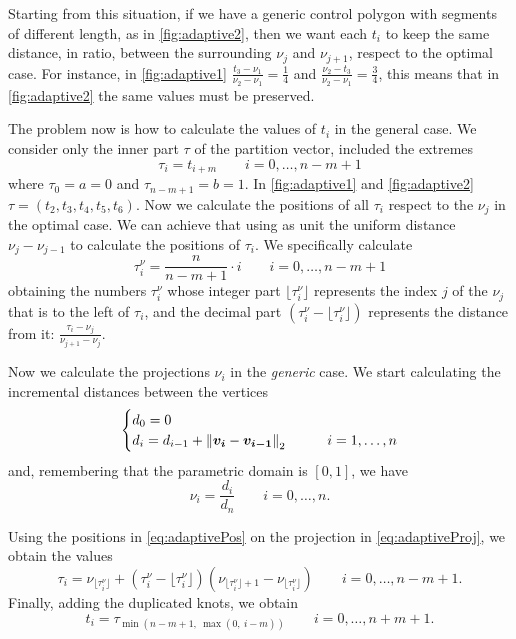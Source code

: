 \documentclass[dissertation.tex]{subfiles}
\begin{document}
Starting from this situation, if
we have a generic control polygon with segments of different length, as
in \cref{fig:adaptive2}, then we want each $t_i$ to keep the same
distance, in ratio, between the surrounding $\nu_j$ and $\nu_{j+1}$,
respect to the optimal case. For instance, in \cref{fig:adaptive1}
$\frac{t_3-\nu_1}{\nu_2-\nu_1}=\frac{1}{4}$ and
$\frac{\nu_2-t_3}{\nu_2-\nu_1}=\frac{3}{4}$, this means that in
\cref{fig:adaptive2} the same values must be preserved.

The problem now is how to calculate the values of $t_i$ in the general
case. We consider only the inner part $\tau$ of the partition vector,
included the extremes
\begin{equation*}
  \tau_i = t_{i+m}\qquad i=0,\dots,n-m+1
\end{equation*}
where $\tau_0=a=0$ and $\tau_{n-m+1}=b=1$. In \cref{fig:adaptive1} and
\cref{fig:adaptive2}
$\tau=(t_2,t_3,t_4,t_5,t_6)$. Now we calculate the positions of all
$\tau_i$ respect to the $\nu_j$ in the optimal case. We can
achieve that using as unit the uniform distance $\nu_j-\nu_{j-1}$ to
calculate the positions of $\tau_i$. We specifically calculate
\begin{equation}\label{eq:adaptivePos}
  \tau_i^\nu=\frac{n}{n-m+1}\cdot i\qquad i=0,\dots,n-m+1
\end{equation}
obtaining the numbers $\tau_i^\nu$ whose integer part
$\lfloor\tau_i^\nu\rfloor$ represents the index $j$ of the
$\nu_j$ that is to the left of $\tau_i$, and the decimal part
$(\tau_i^\nu-\lfloor\tau_i^\nu\rfloor)$ represents the distance from
it: $\frac{\tau_i-\nu_j}{\nu_{j+1}-\nu_j}$.

Now we calculate the projections $\nu_i$ in the
\emph{generic} case.
We start calculating the incremental distances between
the vertices
\begin{equation*}
  \begin{cases}
    d_0=0&\\
    d_i=d_{i-1}+\left\lVert\boldsymbol{v_i}-\boldsymbol{v_{i-1}}\right\rVert_2&\qquad i=1,\dots,n
  \end{cases}
\end{equation*}
and, remembering that the parametric domain is $[0,1]$, we have
\begin{equation}\label{eq:adaptiveProj}
  \nu_i=\frac{d_i}{d_n}\qquad i=0,\dots,n.
\end{equation}

Using the positions in \cref{eq:adaptivePos} on the projection in
\cref{eq:adaptiveProj}, we obtain the values
\begin{equation*}
  \tau_i=\nu_{\lfloor\tau_i^\nu\rfloor}+(\tau_i^\nu-\lfloor\tau_i^\nu\rfloor)(\nu_{\lfloor\tau_i^\nu\rfloor+1}-\nu_{\lfloor\tau_i^\nu\rfloor})\qquad i=0,\dots,n-m+1.
\end{equation*}
Finally, adding the duplicated knots, we obtain
\begin{equation*}
  t_i=\tau_{\min(n-m+1,\ \max(0,\ i-m))}\qquad i=0,\dots,n+m+1.
\end{equation*}
\end{document}
